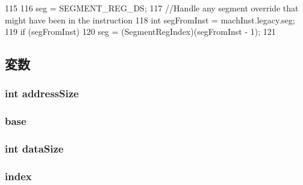 \begin{DoxyCode}
115 {
116     seg = SEGMENT_REG_DS;
117     //Handle any segment override that might have been in the instruction
118     int segFromInst = machInst.legacy.seg;
119     if (segFromInst)
120         seg = (SegmentRegIndex)(segFromInst - 1);
121 }
\end{DoxyCode}


\subsection{変数}
\hypertarget{structX86ISA_1_1EmulEnv_a634857712134690946c76d27713b6fa4}{
\subsubsection[{addressSize}]{\setlength{\rightskip}{0pt plus 5cm}int {\bf addressSize}}}
\label{structX86ISA_1_1EmulEnv_a634857712134690946c76d27713b6fa4}
\hypertarget{structX86ISA_1_1EmulEnv_acd7cdac3bd7929336e8da2a081692dc3}{
\subsubsection[{base}]{ {\bf base}}}
\label{structX86ISA_1_1EmulEnv_acd7cdac3bd7929336e8da2a081692dc3}
\hypertarget{structX86ISA_1_1EmulEnv_a8c8e474bb8d2c6f7162455416b488e50}{
\subsubsection[{dataSize}]{\setlength{\rightskip}{0pt plus 5cm}int {\bf dataSize}}}
\label{structX86ISA_1_1EmulEnv_a8c8e474bb8d2c6f7162455416b488e50}
\hypertarget{structX86ISA_1_1EmulEnv_a4873352bf9ab22e599f727e0140b6cc0}{
\subsubsection[{index}]{ {\bf index}}}
\label{structX86ISA_1_1EmulEnv_a4873352bf9ab22e599f727e0140b6cc0}
